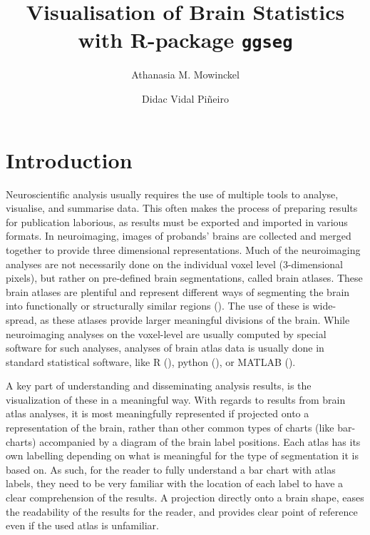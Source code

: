 \documentclass[fleqn,10pt]{wlpeerj} %
\title{Visualisation of Brain Statistics with R-package \texttt{ggseg}}
\author[1]{Athanasia M. Mowinckel}
\author[1]{Didac Vidal Piñeiro}
\affil[1]{Center for Lifespan Changes in Brain and Cognition, Univeristy of Oslo, PO. box 1094 Blindern, 0317 Oslo, Norway}
\begin{document}
\flushbottom
\maketitle
\thispagestyle{empty}

\hypertarget{introduction}{%
\section{Introduction}\label{introduction}}

Neuroscientific analysis usually requires the use of multiple tools to analyse, visualise, and summarise data.
This often makes the process of preparing results for publication laborious, as results must be exported and imported in various formats.
In neuroimaging, images of probands' brains are collected and merged together to provide three dimensional representations.
Much of the neuroimaging analyses are not necessarily done on the individual voxel level (3-dimensional pixels), but rather on pre-defined brain segmentations, called brain atlases.
These brain atlases are plentiful and represent different ways of segmenting the brain into functionally or structurally similar regions (\citet{dkt}).
The use of these is wide-spread, as these atlases provide larger meaningful divisions of the brain.
While neuroimaging analyses on the voxel-level are usually computed by special software for such analyses, analyses of brain atlas data is usually done in standard statistical software, like R (\citet{R}), python (\citet{python}), or MATLAB (\citet{MATLAB}).

A key part of understanding and disseminating analysis results, is the visualization of these in a meaningful way.
With regards to results from brain atlas analyses, it is most meaningfully represented if projected onto a representation of the brain, rather than other common types of charts (like bar-charts) accompanied by a diagram of the brain label positions.
Each atlas has its own labelling depending on what is meaningful for the type of segmentation it is based on.
As such, for the reader to fully understand a bar chart with atlas labels, they need to be very familiar with the location of each label to have a clear comprehension of the results.
A projection directly onto a brain shape, eases the readability of the results for the reader, and provides clear point of reference even if the used atlas is unfamiliar.
\end{document}
